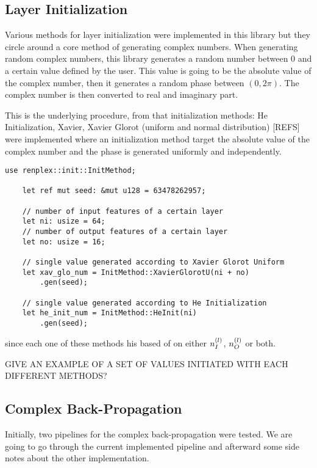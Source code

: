 \subsection{Layer Initialization}

Various methods for layer initialization were implemented in this library but they circle around a core method of generating complex numbers. When generating random complex numbers, this library generates a random number between 0 and a certain value defined by the user. This value is going to be the absolute value of the complex number, then it generates a random phase between $  (0, 2\pi) $. The complex number is then converted to real and imaginary part.

This is the underlying procedure, from that initialization methods: He Initialization, Xavier, Xavier Glorot (uniform and normal distribution) [REFS] were implemented where an initialization method target the absolute value of the complex number and the phase is generated uniformly and independently.

\begin{lstlisting}[caption=Demonstration of how to generate complex random numbers with Xavier Glorot Uniform and He initialization respectively.]
	use renplex::init::InitMethod;
	
	let ref mut seed: &mut u128 = 63478262957;
	
	// number of input features of a certain layer
	let ni: usize = 64;
	// number of output features of a certain layer
	let no: usize = 16;
	
	// single value generated according to Xavier Glorot Uniform
	let xav_glo_num = InitMethod::XavierGlorotU(ni + no)
		.gen(seed);
	
	// single value generated according to He Initialization
	let he_init_num = InitMethod::HeInit(ni)
		.gen(seed);
\end{lstlisting}
since each one of these methods his based of on either $ n^{(l)}_{I} $,  $ n^{(l)}_{O} $ or both.

GIVE AN EXAMPLE OF A SET OF VALUES INITIATED WITH EACH DIFFERENT METHODS?

\subsection{Complex Back-Propagation}

Initially, two pipelines for the complex back-propagation were tested. We are going to go through the current implemented pipeline and afterward some side notes about the other implementation.

